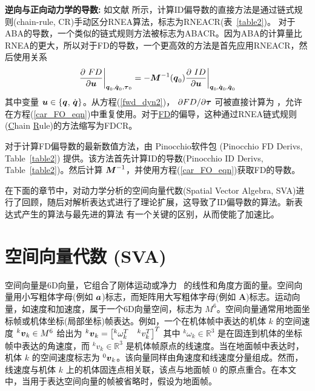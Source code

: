 \documentclass[letterpaper, 10 pt, conference]{ieeetran}  %
\begin{document}
\vspace{1ex}
{\noindent \bf 逆向与正向动力学的导数:}
如文献 \cite{car} 所示，计算ID偏导数的直接方法是通过链式规则(chain-rule, CR)手动区分RNEA算法，标志为RNEACR(表~\ref{table2})。
对于ABA的导数，一个类似的链式规则方法被标志为ABACR。因为ABA的计算量比RNEA的更大，所以对于FD的导数，一个更高效的方法是首先应用RNEACR，然后使用关系 \cite{car,jain}
  \begin{equation}
      \frac{\partial~FD}{\partial \boldsymbol u}\biggr\rvert_{\q_{0},  \qd_{0}, \taubar_{0}} = -\M^{-1}(\q_{0}) \frac{\partial~  ID }{\partial \boldsymbol u}\biggr\rvert_{\q_{0},  \qd_{0},  \qdd_{0}}
      \label{car_FO_eqn}
  \end{equation}
其中变量 $ {\boldsymbol u} \in \{ \boldsymbol{q}$, $\dot{\boldsymbol{q}} \}$。从方程(\ref{fwd_dyn2})， $\partial FD / \partial \boldsymbol{\tau}$
  可被直接计算为 ，允许在方程(\ref{car_FO_eqn})中重复使用。对于\underline{FD}的偏导，这种通过RNEA链式规则({\underline C}hain {\underline R}ule)的方法缩写为FDCR。

对于计算FD偏导数的最新数值方法，由 Pinocchio软件包 \cite{car_code} (Pinocchio FD Derivs, Table~\ref{table2}) 提供。该方法首先计算ID的导数(Pinocchio ID Derivs, Table~\ref{table2})。然后计算 $\boldsymbol{M}^{-1}$，并使用方程(\ref{car_FO_eqn})获取FD的导数。
 
在下面的章节中，对动力学分析的空间向量代数(Spatial Vector Algebra, SVA)进行了回顾，随后对解析表达式进行了理论扩展，这导致了ID偏导数的算法。新表达式产生的算法与最先进的算法 \cite{car_code} 有一个关键的区别，从而使能了加速比。
 
 



\section{空间向量代数 (SVA)}
\label{iden_defn}



空间向量是6D向量，它组合了刚体运动或净力~\cite{rbd} 的线性和角度方面的量。空间向量用小写粗体字母(例如 $\boldsymbol{a}$)标志，而矩阵用大写粗体字母(例如 $\boldsymbol{A}$)标志。运动向量，如速度和加速度，属于一个6D向量空间，标志为 $M^{6}$。空间向量通常用地面坐标帧或机体坐标(局部坐标)帧表达。例如，一个在机体帧中表达的机体 $k$ 的空间速度 ${}^{k}\boldsymbol{v}_{k} \in M^{6}$ 给出为
${}^{k}\boldsymbol{v}_{k} = \begin{bmatrix}
           {}^{k}\omega_{k}^T &
           {}^{k}v_{k}^T
         \end{bmatrix}^T$
其中 ${}^{k}\omega_{k} \in \mathbb{R}^{3}$ 是在固连到机体的坐标帧中表达的角速度，而 ${}^{k}v_{k} \in \mathbb{R}^{3}$ 是机体帧原点的线速度。当在地面帧中表达时，机体 $k$ 的空间速度标志为 ${}^{0}\boldsymbol{v}_{k}$。该向量同样由角速度和线速度分量组成。然而，线速度与机体 $k$ 上的机体固连点相关联，该点与地面帧 $0$ 的原点重合。在本文中，当用于表达空间向量的帧被省略时，假设为地面帧。
\end{document}
